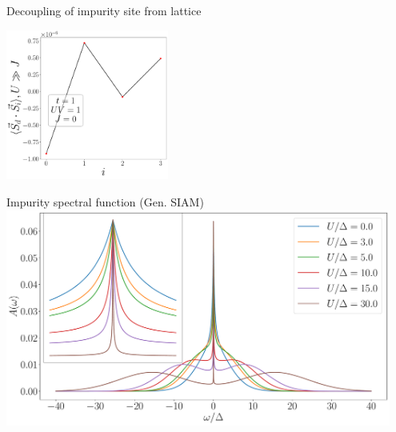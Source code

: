 \documentclass[aspectratio=169]{beamer}
\begin{document}
\begin{frame}[noframenumbering]{Decoupling of impurity site from lattice}
{\begin{center}
\hspace*{\fill}
\includegraphics[width=0.4\textwidth]{figures/corr-di-max-t=1.000,V=1_over_U,J=0,N=4,U=0.010,100.000,100.pdf}
\hspace*{\fill}
\end{center}
}
\end{frame}

\begin{frame}[noframenumbering]{Impurity spectral function (Gen. SIAM)}
	\centering
	\includegraphics[width=0.95\textwidth]{figures/gen_siam_spec_func.pdf}
\end{frame}
\end{document}
